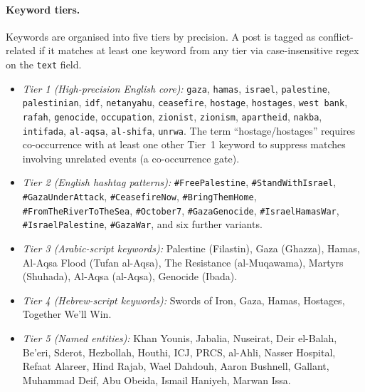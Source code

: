 \documentclass[12pt, a4paper]{article}
\begin{document}
\paragraph{Keyword tiers.} Keywords are organised into five tiers by precision. A post is tagged as conflict-related if it matches at least one keyword from any tier via case-insensitive regex on the \texttt{text} field.

\begin{itemize}
  \item \textit{Tier 1 (High-precision English core):} \texttt{gaza}, \texttt{hamas}, \texttt{israel}, \texttt{palestine}, \texttt{palestinian}, \texttt{idf}, \texttt{netanyahu}, \texttt{ceasefire}, \texttt{hostage}, \texttt{hostages}, \texttt{west bank}, \texttt{rafah}, \texttt{genocide}, \texttt{occupation}, \texttt{zionist}, \texttt{zionism}, \texttt{apartheid}, \texttt{nakba}, \texttt{intifada}, \texttt{al-aqsa}, \texttt{al-shifa}, \texttt{unrwa}. The term ``hostage/hostages'' requires co-occurrence with at least one other Tier~1 keyword to suppress matches involving unrelated events (a co-occurrence gate).

  \item \textit{Tier 2 (English hashtag patterns):} \texttt{\#FreePalestine}, \texttt{\#StandWithIsrael}, \texttt{\#GazaUnderAttack}, \texttt{\#CeasefireNow}, \texttt{\#BringThemHome}, \texttt{\#FromTheRiverToTheSea}, \texttt{\#October7}, \texttt{\#GazaGenocide}, \texttt{\#IsraelHamasWar}, \texttt{\#IsraelPalestine}, \texttt{\#GazaWar}, and six further variants.

  \item \textit{Tier 3 (Arabic-script keywords):} Palestine (Filastin), Gaza (Ghazza), Hamas, Al-Aqsa Flood (Tufan al-Aqsa), The Resistance (al-Muqawama), Martyrs (Shuhada), Al-Aqsa (al-Aqsa), Genocide (Ibada).

  \item \textit{Tier 4 (Hebrew-script keywords):} Swords of Iron, Gaza, Hamas, Hostages, Together We'll Win.

  \item \textit{Tier 5 (Named entities):} Khan Younis, Jabalia, Nuseirat, Deir el-Balah, Be'eri, Sderot, Hezbollah, Houthi, ICJ, PRCS, al-Ahli, Nasser Hospital, Refaat Alareer, Hind Rajab, Wael Dahdouh, Aaron Bushnell, Gallant, Muhammad Deif, Abu Obeida, Ismail Haniyeh, Marwan Issa.
\end{itemize}
\end{document}
